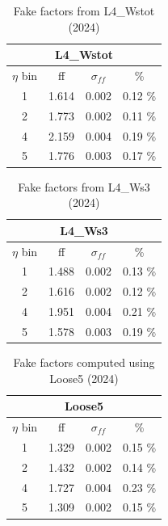 \begin{minipage}[t]{\textwidth}
  \begin{minipage}[t]{0.32\textwidth}
    \begin{table}[H]
      \centering
      \begin{tabular}{|c|c|c|c|}
        \hline
        \multicolumn{4}{|c|}{\textbf{L4\_Wstot}} \\
        \hline
        $\eta$ bin & ff & $\sigma_{ff}$ & \% \\
        \hline
        1 & 1.614 & 0.002 & 0.12 \% \\
        \hline
        2 & 1.773 & 0.002 & 0.11 \% \\
        \hline
        4 & 2.159 & 0.004 & 0.19 \% \\
        \hline
        5 & 1.776 & 0.003 & 0.17 \% \\
        \hline
      \end{tabular}
      \caption{Fake factors from L4\_Wstot (2024)}
    \end{table}
  \end{minipage}
  \begin{minipage}[t]{0.32\textwidth}
    \begin{table}[H]
      \centering
      \begin{tabular}{|c|c|c|c|}
        \hline
        \multicolumn{4}{|c|}{\textbf{L4\_Ws3}} \\
        \hline
        $\eta$ bin & ff & $\sigma_{ff}$ & \% \\
        \hline
        1 & 1.488 & 0.002 & 0.13 \% \\
        \hline
        2 & 1.616 & 0.002 & 0.12 \% \\
        \hline
        4 & 1.951 & 0.004 & 0.21 \% \\
        \hline
        5 & 1.578 & 0.003 & 0.19 \% \\
        \hline
      \end{tabular}
      \caption{Fake factors from L4\_Ws3 (2024)}
    \end{table}
  \end{minipage}
  \begin{minipage}[t]{0.32\textwidth}
    \begin{table}[H]
      \centering
      \begin{tabular}{|c|c|c|c|}
        \hline
        \multicolumn{4}{|c|}{\textbf{Loose5}} \\
        \hline
        $\eta$ bin & ff & $\sigma_{ff}$ & \% \\
        \hline
        1 & 1.329 & 0.002 & 0.15 \% \\
        \hline
        2 & 1.432 & 0.002 & 0.14 \% \\
        \hline
        4 & 1.727 & 0.004 & 0.23 \% \\
        \hline
        5 & 1.309 & 0.002 & 0.15 \% \\
        \hline
      \end{tabular}
      \caption{Fake factors computed using Loose5 (2024)}
    \end{table}
  \end{minipage}


\end{minipage}
